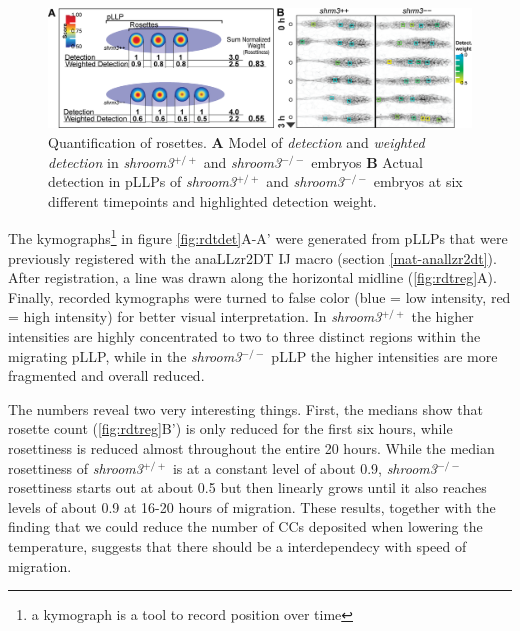 \documentclass[11pt,singlespacinge,twoside]{reedthesis} %
\theoremstyle{definition}
\theoremstyle{definition}
\theoremstyle{definition}
\theoremstyle{remark}
\begin{document}
\begin{figure}[H]

{\centering \includegraphics[width=0.95\linewidth,]{figures/results/03_rosettes/detection_model} 

}

\caption[Quantification of rosettes]{Quantification of rosettes. \textbf{A} Model of \emph{detection} and \emph{weighted detection} in \emph{shroom3}\(^{+/+}\) and \emph{shroom3}\(^{-/-}\) embryos \textbf{B} Actual detection in pLLPs of \emph{shroom3}\(^{+/+}\) and \emph{shroom3}\(^{-/-}\) embryos at six different timepoints and highlighted detection weight.}\label{fig:rdtdetmdl}
\end{figure}
The kymographs\footnote{a kymograph is a tool to record position over time} in figure \ref{fig:rdtdet}A-A' were generated from pLLPs that were previously registered with the anaLLzr2DT IJ macro (section \ref{mat-anallzr2dt}). After registration, a line was drawn along the horizontal midline (\ref{fig:rdtreg}A). Finally, recorded kymographs were turned to false color (blue = low intensity, red = high intensity) for better visual interpretation. In \emph{shroom3}\(^{+/+}\) the higher intensities are highly concentrated to two to three distinct regions within the migrating pLLP, while in the \emph{shroom3}\(^{-/-}\) pLLP the higher intensities are more fragmented and overall reduced.

The numbers reveal two very interesting things. First, the medians show that rosette count (\ref{fig:rdtreg}B') is only reduced for the first six hours, while rosettiness is reduced almost throughout the entire 20 hours. While the median rosettiness of \emph{shroom3}\(^{+/+}\) is at a constant level of about 0.9, \emph{shroom3}\(^{-/-}\) rosettiness starts out at about 0.5 but then linearly grows until it also reaches levels of about 0.9 at 16-20 hours of migration. These results, together with the finding that we could reduce the number of CCs deposited when lowering the temperature, suggests that there should be a interdependecy with speed of migration.
\end{document}
